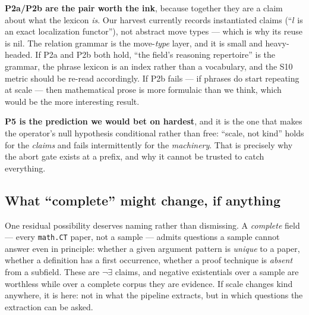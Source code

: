 \medskip
\textbf{P2a/P2b are the pair worth the ink}, because together they are a claim
about what the lexicon \emph{is}. Our harvest currently records instantiated
claims (``$l$ is an exact localization functor''), not abstract move types ---
which is why its reuse is nil. The relation grammar is the move-\emph{type}
layer, and it is small and heavy-headed. If P2a and P2b both hold, ``the field's
reasoning repertoire'' is the grammar, the phrase lexicon is an index rather
than a vocabulary, and the S10 metric should be re-read accordingly. If P2b
fails --- if phrases do start repeating at scale --- then mathematical prose is
more formulaic than we think, which would be the more interesting result.

\textbf{P5 is the prediction we would bet on hardest}, and it is the one that
makes the operator's null hypothesis conditional rather than free: ``scale, not
kind'' holds for the \emph{claims} and fails intermittently for the
\emph{machinery}. That is precisely why the abort gate exists at a prefix, and
why it cannot be trusted to catch everything.

\subsection*{What ``complete'' might change, if anything}

One residual possibility deserves naming rather than dismissing. A
\emph{complete} field --- every \texttt{math.CT} paper, not a sample --- admits
questions a sample cannot answer even in principle: whether a given argument
pattern is \emph{unique} to a paper, whether a definition has a first
occurrence, whether a proof technique is \emph{absent} from a subfield. These
are $\neg\exists$ claims, and negative existentials over a sample are worthless
while over a complete corpus they are evidence. If scale changes kind anywhere,
it is here: not in what the pipeline extracts, but in which questions the
extraction can be asked.
